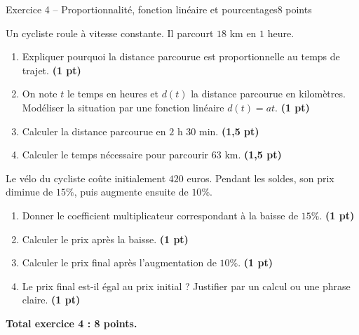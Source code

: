 \documentclass[11pt,a4paper]{article}
\newcommand{\pts}[1]{\hfill \textbf{(#1 pt)}}
\begin{document}
\begin{exercicebox}{Exercice 4 -- Proportionnalité, fonction linéaire et pourcentages}{8 points}

Un cycliste roule à vitesse constante. Il parcourt $18$ km en $1$ heure.

\begin{enumerate}
    \item Expliquer pourquoi la distance parcourue est proportionnelle au temps de trajet. \pts{1}

    \item On note $t$ le temps en heures et $d(t)$ la distance parcourue en kilomètres. Modéliser la situation par une fonction linéaire $d(t)=at$. \pts{1}

    \item Calculer la distance parcourue en $2$ h $30$ min. \pts{1,5}

    \item Calculer le temps nécessaire pour parcourir $63$ km. \pts{1,5}
\end{enumerate}

Le vélo du cycliste coûte initialement $420$ euros. Pendant les soldes, son prix diminue de $15\%$, puis augmente ensuite de $10\%$.

\begin{enumerate}[resume]
    \item Donner le coefficient multiplicateur correspondant à la baisse de $15\%$. \pts{1}

    \item Calculer le prix après la baisse. \pts{1}

    \item Calculer le prix final après l’augmentation de $10\%$. \pts{1}

    \item Le prix final est-il égal au prix initial ? Justifier par un calcul ou une phrase claire. \pts{1}
\end{enumerate}

\textbf{Total exercice 4 : 8 points.}

\end{exercicebox}
\end{document}
